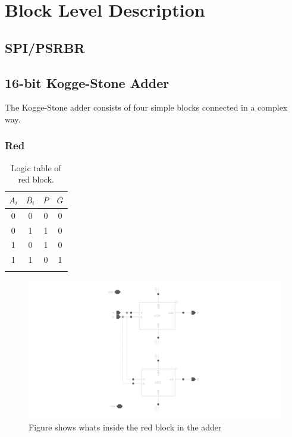 \section{Block Level Description}

\subsection{SPI/PSRBR}

\subsection{16-bit Kogge-Stone Adder}
The Kogge-Stone adder consists of four simple blocks connected in a complex way.

\noindent {}

\subsubsection{Red}

\begin{table}[H]
  \caption{Logic table of red block.}
  \centering
  \begin{tabular}{cc|cc}
    \toprule
    $A_i$ & $B_i$ & $P$ & $G$ \\
    \midrule
    0 & 0 & 0 & 0 \\
    0 & 1 & 1 & 0 \\
    1 & 0 & 1 & 0 \\
    1 & 1 & 0 & 1 \\
    \bottomrule
    \label{tab:red}
  \end{tabular}
\end{table}

\begin{figure}[H]
  \centering
  \captionsetup{justification=centering}
  \includegraphics[clip,width=1.0\textwidth]{../figures/red}
  \caption{Figure shows whats inside the red block in the adder} \label{fig:red}
\end{figure}
